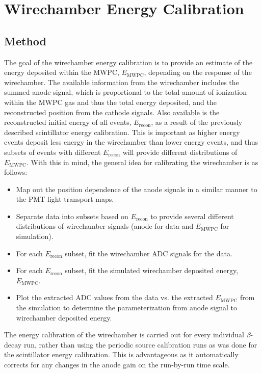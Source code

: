 
\section{Wirechamber Energy Calibration}

\subsection{Method}

The goal of the wirechamber energy calibration is to provide an estimate of
the energy deposited within the MWPC, $E_{\mathrm{MWPC}}$, depending on the
response of the wirechamber. The available information from the wirechamber includes the
summed anode signal, which is proportional to the total amount of ionization
within the MWPC gas and thus the total energy deposited, and the reconstructed position from the cathode signals.
Also available is the reconstructed initial energy of all events, $E_{\mathrm{recon}}$, as a result of the
previously described scintillator energy calibration. This is important as higher energy events deposit
less energy in the wirechamber than lower energy events, and thus subsets of events with
different $E_{\mathrm{recon}}$ will provide different distributions of $E_{\mathrm{MWPC}}$.
With this in mind, the general idea for calibrating the wirechamber is as follows:

\begin{itemize}
\item Map out the position dependence of the anode signals in a similar manner to the
  PMT light transport maps.
\item Separate data into subsets based on $E_{\mathrm{recon}}$
  to provide several different distributions of wirechamber signals (anode for data and $E_{\mathrm{MWPC}}$
  for simulation).
\item For each $E_{\mathrm{recon}}$ subset, fit the wirechamber ADC signals for the data.
\item For each $E_{\mathrm{recon}}$ subset, fit the simulated wirechamber deposited energy, $E_{\mathrm{MWPC}}$.
\item Plot the extracted ADC values from the data vs. the extracted $E_{\mathrm{MWPC}}$ from the simulation to
  determine the parameterization from anode signal to wirechamber deposited energy.
\end{itemize}

The energy calibration of the wirechamber is carried out for every individual $\beta$-decay run,
rather than using the periodic
source calibration runs as was done for the scintillator energy calibration. This is advantageous as
it automatically corrects for any changes in the anode gain on the run-by-run time scale. 


